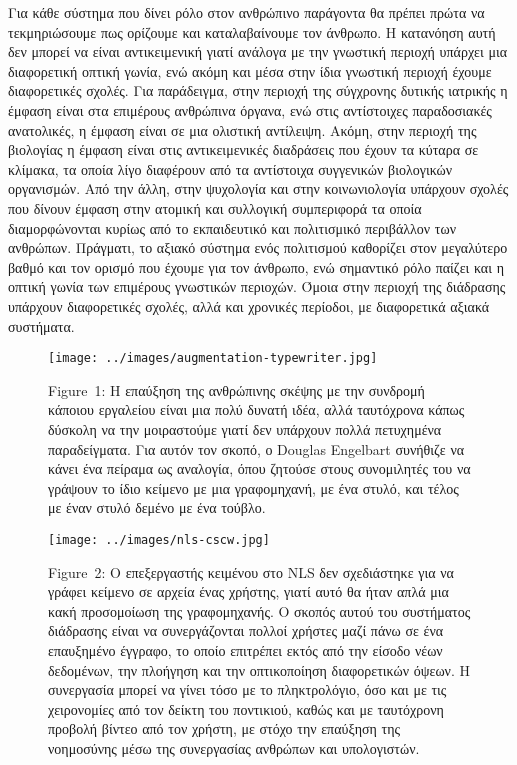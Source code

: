 \documentclass[
]{article}
\begin{document}
Για κάθε σύστημα που δίνει ρόλο στον ανθρώπινο παράγοντα θα πρέπει πρώτα
να τεκμηριώσουμε πως ορίζουμε και καταλαβαίνουμε τον άνθρωπο. Η
κατανόηση αυτή δεν μπορεί να είναι αντικειμενική γιατί ανάλογα με την
γνωστική περιοχή υπάρχει μια διαφορετική οπτική γωνία, ενώ ακόμη και
μέσα στην ίδια γνωστική περιοχή έχουμε διαφορετικές σχολές. Για
παράδειγμα, στην περιοχή της σύγχρονης δυτικής ιατρικής η έμφαση είναι
στα επιμέρους ανθρώπινα όργανα, ενώ στις αντίστοιχες παραδοσιακές
ανατολικές, η έμφαση είναι σε μια ολιστική αντίλειψη. Ακόμη, στην
περιοχή της βιολογίας η έμφαση είναι στις αντικειμενικές διαδράσεις που
έχουν τα κύταρα σε κλίμακα, τα οποία λίγο διαφέρουν από τα αντίστοιχα
συγγενικών βιολογικών οργανισμών. Από την άλλη, στην ψυχολογία και στην
κοινωνιολογία υπάρχουν σχολές που δίνουν έμφαση στην ατομική και
συλλογική συμπεριφορά τα οποία διαμορφώνονται κυρίως από το εκπαιδευτικό
και πολιτισμικό περιβάλλον των ανθρώπων. Πράγματι, το αξιακό σύστημα
ενός πολιτισμού καθορίζει στον μεγαλύτερο βαθμό και τον ορισμό που
έχουμε για τον άνθρωπο, ενώ σημαντικό ρόλο παίζει και η οπτική γωνία των
επιμέρους γνωστικών περιοχών. Όμοια στην περιοχή της διάδρασης υπάρχουν
διαφορετικές σχολές, αλλά και χρονικές περίοδοι, με διαφορετικά αξιακά
συστήματα.

\leavevmode{}%
\begin{figure}
\hypertarget{fig:augmentation-typewriter}{%
\centering
\texttt{[image: ../images/augmentation-typewriter.jpg]}
\caption{Figure~1: Η επαύξηση της ανθρώπινης σκέψης με την συνδρομή
κάποιου εργαλείου είναι μια πολύ δυνατή ιδέα, αλλά ταυτόχρονα κάπως
δύσκολη να την μοιραστούμε γιατί δεν υπάρχουν πολλά πετυχημένα
παραδείγματα. Για αυτόν τον σκοπό, ο Douglas Engelbart συνήθιζε να κάνει
ένα πείραμα ως αναλογία, όπου ζητούσε στους συνομιλητές του να γράψουν
το ίδιο κείμενο με μια γραφομηχανή, με ένα στυλό, και τέλος με έναν
στυλό δεμένο με ένα τούβλο.}\label{fig:augmentation-typewriter}
}
\end{figure}

\leavevmode{}%
\begin{figure}
\hypertarget{fig:nls-cscw}{%
\centering
\texttt{[image: ../images/nls-cscw.jpg]}
\caption{Figure~2: Ο επεξεργαστής κειμένου στο NLS δεν σχεδιάστηκε για
να γράφει κείμενο σε αρχεία ένας χρήστης, γιατί αυτό θα ήταν απλά μια
κακή προσομοίωση της γραφομηχανής. Ο σκοπός αυτού του συστήματος
διάδρασης είναι να συνεργάζονται πολλοί χρήστες μαζί πάνω σε ένα
επαυξημένο έγγραφο, το οποίο επιτρέπει εκτός από την είσοδο νέων
δεδομένων, την πλοήγηση και την οπτικοποίηση διαφορετικών όψεων. Η
συνεργασία μπορεί να γίνει τόσο με το πληκτρολόγιο, όσο και με τις
χειρονομίες από τον δείκτη του ποντικιού, καθώς και με ταυτόχρονη
προβολή βίντεο από τον χρήστη, με στόχο την επαύξηση της νοημοσύνης μέσω
της συνεργασίας ανθρώπων και υπολογιστών.}\label{fig:nls-cscw}
}
\end{figure}
\end{document}
